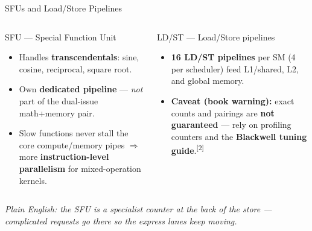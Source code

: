 \documentclass[aspectratio=169]{beamer}
\newcommand{\kw}[1]{\textbf{\textcolor{kwblue}{#1}}}
\newcommand{\pe}[1]{{\footnotesize\itshape Plain English: #1}}
\newcommand{\refmark}[1]{\textsuperscript{[#1]}}
\begin{document}
\begin{frame}{SFUs and Load/Store Pipelines}
  \begin{columns}[t]
    \begin{block}{SFU --- Special Function Unit}
      \begin{itemize}\small
        \item Handles \kw{transcendentals}: sine, cosine, reciprocal, square root.
        \item Own \kw{dedicated pipeline} --- \emph{not} part of the dual-issue math+memory pair.
        \item Slow functions never stall the core compute/memory pipes $\Rightarrow$
              more \kw{instruction-level parallelism} for mixed-operation kernels.
      \end{itemize}
    \end{block}
    \begin{block}{LD/ST --- Load/Store pipelines}
      \begin{itemize}\small
        \item \kw{16 LD/ST pipelines} per SM (4 per scheduler) feed L1/shared, L2, and global memory.
        \item \kw{Caveat (book warning):} exact counts and pairings are \kw{not guaranteed} ---
              rely on profiling counters and the \kw{Blackwell tuning guide}.\refmark{2}
      \end{itemize}
    \end{block}
  \end{columns}
  \medskip
  \pe{the SFU is a specialist counter at the back of the store --- complicated requests go there so the express lanes keep moving.}
\end{frame}
\end{document}
